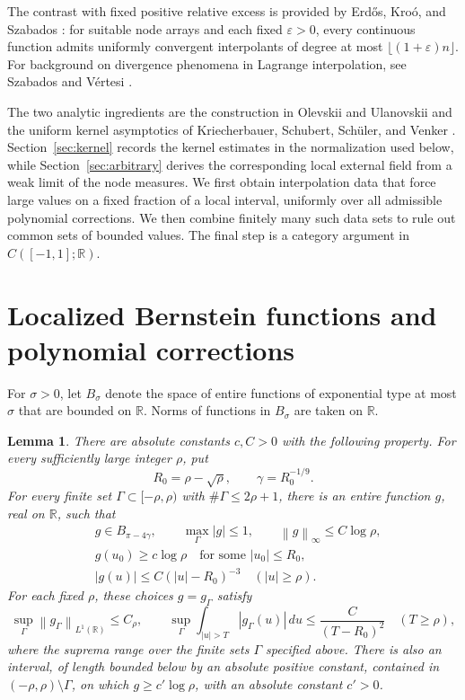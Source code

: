 \documentclass[11pt]{article}
\newtheorem{lemma}[theorem]{Lemma}
\theoremstyle{definition}
\numberwithin{equation}{section}
\newcommand{\R}{\mathbb R}
\newcommand{\norm}[1]{\left\lVert #1\right\rVert}
\begin{document}
The contrast with fixed positive relative excess is provided by Erd\H{o}s,
Kro\'o, and Szabados \cite{EKS89}: for suitable node arrays and each fixed
\(\varepsilon>0\), every continuous function admits uniformly convergent
interpolants of degree at most \(\lfloor(1+\varepsilon)n\rfloor\).
For background on divergence phenomena in Lagrange interpolation, see
Szabados and V\'ertesi \cite{SV90}.

The two analytic ingredients are the construction in
Olevskii and Ulanovskii \cite[Lemma 4.1]{OU} and the uniform kernel
asymptotics of Kriecherbauer, Schubert, Sch\"uler, and Venker
\cite[Theorem 1.3 and Theorem 1.8 (bulk universality)]{KSSV}.
Section~\ref{sec:kernel} records the kernel estimates in the normalization
used below, while Section~\ref{sec:arbitrary} derives the corresponding
local external field from a weak limit of the node measures.
We first obtain interpolation data that force large values on a fixed
fraction of a local interval, uniformly over all admissible polynomial
corrections. We then combine finitely many such data sets to rule out
common sets of bounded values. The final step is a category argument
in \(C([-1,1];\R)\).

\section{Localized Bernstein functions and polynomial corrections}
\label{sec:bernstein}

For \(\sigma>0\), let \(B_\sigma\) denote the space of entire functions
of exponential type at most \(\sigma\) that are bounded on \(\R\).
Norms of functions in \(B_\sigma\) are taken on \(\R\).

\begin{lemma}\label{lem:bernstein}
There are absolute constants \(c,C>0\) with the following property.
For every sufficiently large integer \(\rho\), put
\[
 R_0=\rho-\sqrt{\rho},
 \qquad \gamma=R_0^{-1/9}.
\]
For every finite set \(\Gamma\subset[-\rho,\rho)\) with
\(\#\Gamma\le2\rho+1\), there is an entire function \(g\), real on
\(\R\), such that
\begin{align}
 &g\in B_{\pi-4\gamma},
 \qquad \max_{\Gamma}|g|\le1,
 \qquad \norm{g}_\infty\le C\log\rho, \label{eq:bernstein-norm}\\
 &g(u_0)\ge c\log\rho
 \quad\text{for some }|u_0|\le R_0, \label{eq:bernstein-peak}\\
 &|g(u)|\le C(|u|-R_0)^{-3}
 \quad (|u|\ge\rho). \label{eq:bernstein-tail}
\end{align}
For each fixed \(\rho\), these choices \(g=g_\Gamma\) satisfy
\[
 \sup_\Gamma\norm{g_\Gamma}_{L^1(\R)}\le C_\rho,
 \qquad
 \sup_\Gamma\int_{|u|>T}|g_\Gamma(u)|\,du
 \le\frac{C}{(T-R_0)^2}\quad(T\ge\rho),
\]
where the suprema range over the finite sets \(\Gamma\) specified above.
There is also an interval, of length bounded below by an absolute
positive constant, contained in \((-\rho,\rho)\setminus\Gamma\), on
which \(g\ge c'\log\rho\), with an absolute constant \(c'>0\).
\end{lemma}
\end{document}
